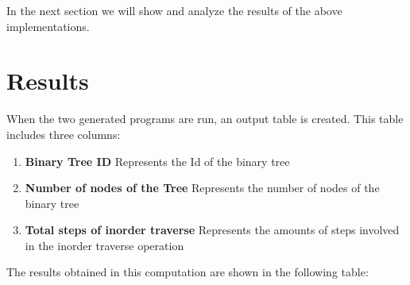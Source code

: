 \documentclass[12p]{report}
\begin{document}
In the next section we will show and analyze the results of the above implementations.


  \section{Results}
When the two generated programs are run, an output table is created. This table includes three columns:
\begin{enumerate}
  \item \textbf{Binary Tree ID } Represents the Id of the binary tree
  \item \textbf{Number of nodes of the Tree } Represents the number of nodes of the binary tree 
  \item \textbf{Total steps of inorder traverse } Represents the amounts of steps involved in the inorder traverse operation
\end{enumerate}

The results obtained in this computation are shown in the following table:

\end{document}
